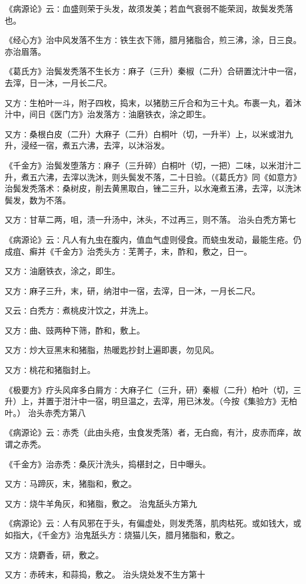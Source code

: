 \documentclass[a4paper,12pt,UTF8,twoside]{ctexbook}
\begin{document}
《病源论》云∶血盛则荣于头发，故须发美；若血气衰弱不能荣润，故鬓发秃落也。

《经心方》治中风发落不生方∶铁生衣下筛，腊月猪脂合，煎三沸，涂，日三良。亦治眉落。

《葛氏方》治鬓发秃落不生长方∶麻子（三升）秦椒（二升）合研置沈汁中一宿，去滓，日一沐，一月长二尺。

又方∶生柏叶一斗，附子四枚，捣末，以猪肪三斤合和为三十丸。布裹一丸，着沐汁中，间日《医门方》治发落方∶油磨铁衣，涂之即生。

又方∶桑根白皮（二升）大麻子（二升）白桐叶（切，一升半）上，以米或泔九升，浸经一宿，煮五六沸，去滓，以沐浴发。

《千金方》治鬓发堕落方∶麻子（三升碎）白桐叶（切，一把）二味，以米泔汁二升，煮五六沸，去滓以洗沐，则头鬓发不落，二十日验。（《葛氏方》同《如意方》治鬓发秃落术∶桑树皮，削去黄黑取白，锉二三升，以水淹煮五沸，去滓，以洗沐鬓发，数为不落。

又方∶甘草二两，咀，渍一升汤中，沐头，不过再三，则不落。
治头白秃方第七

《病源论》云∶凡人有九虫在腹内，值血气虚则侵食。而蛲虫发动，最能生疮。仍成疽、癣并《千金方》治秃头方∶芜菁子，末，酢和，敷之，日一。

又方∶油磨铁衣，涂之，即生。

又方∶麻子三升，末，研，纳泔中一宿，去滓，日一沐，一月长二尺。

又云∶白秃方∶煮桃皮汁饮之，并洗上。

又方∶曲、豉两种下筛，酢和，敷上。

又方∶炒大豆黑末和猪脂，热暖匙抄封上遍即裹，勿见风。

又方∶桃花和猪脂封上。

《极要方》疗头风痒多白屑方∶大麻子仁（三升，研）秦椒（二升）柏叶（切，三升）上，并置于泔汁中一宿，明旦温之，去滓，用已沐发。（今按《集验方》无柏叶。）
治头赤秃方第八

《病源论》云∶赤秃（此由头疮，虫食发秃落）者，无白痂，有汁，皮赤而痒，故谓之赤秃。

《千金方》治赤秃∶桑灰汁洗头，捣椹封之，日中曝头。

又方∶马蹄灰，末，猪脂和，敷之。

又方∶烧牛羊角灰，和猪脂，敷之。
治鬼舐头方第九

《病源论》云∶人有风邪在于头，有偏虚处，则发秃落，肌肉枯死。或如钱大，或如指大，《千金方》治鬼舐头方∶烧猫儿矢，腊月猪脂和，敷之。

又方∶烧麝香，研，敷之。

又方∶赤砖末，和蒜捣，敷之。
治头烧处发不生方第十
\end{document}
